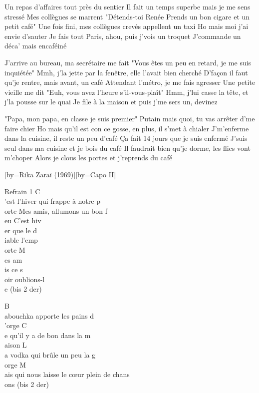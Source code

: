 \beginverse
Un repas d'affaires tout près du sentier
Il fait un temps superbe mais je me sens stressé
Mes collègues se marrent "Détends-toi Renée
Prends un bon cigare et un petit café"
Une fois fini, mes collègues crevés appellent un taxi
Ho mais moi j'ai envie d'sauter
Je fais tout Paris, ahou, puis j'vois un troquet
J'commande un déca' mais encaféiné
\endverse

\beginverse
J'arrive au bureau, ma secrétaire me fait
"Vous êtes un peu en retard, je me suis inquiétée"
Mmh, j'la jette par la fenêtre, elle l'avait bien cherché
D'façon il faut qu'je rentre, mais avant, un café
Attendant l'métro, je me fais agresser
Une petite vieille me dit "Euh, vous avez l'heure s'il-vous-plaît"
Hmm, j'lui casse la tête, et j'la pousse sur le quai
Je file à la maison et puis j'me sers un, devinez
\endverse

"Papa, mon papa, en classe je suis premier"
Putain mais quoi, tu vas arrêter d'me faire chier
Ho mais qu'il est con ce gosse, en plus, il s'met à chialer
J'm'enferme dans la cuisine, il reste un peu d'café
Ça fait 14 jours que je suis enfermé
J'suis seul dans ma cuisine et je bois du café
Il faudrait bien qu'je dorme, les flics vont m'choper
Alors je clous les portes et j'reprends du café

[by={Rika Zaraï (1969)}][by={Capo II}]

\beginverse
Refrain 1
C\\[Lam]'est l'hiver qui frappe à notre p\\[Mim]orte
Mes amis, allumons un bon f\\[Lam]eu
C'est hiv\\[Do]er que le d\\[Sol]iable l'emp\\[Lam]orte
M\\[Rém]es am\\[Lam]is ce s\\[Mi]oir oublions-l\\[Lam]e
(bis 2 der)
\endverse

\beginverse
B\\[La]abouchka apporte les pains d\\[Ré]'orge
C\\[Mi]e qu'il y a de bon dans la m\\[La]aison 
L\\[La]a vodka qui brûle un peu la g\\[Ré]orge
M\\[Mi]ais qui nous laisse le cœur plein de chans\\[La]ons
(bis 2 der)
\endverse

